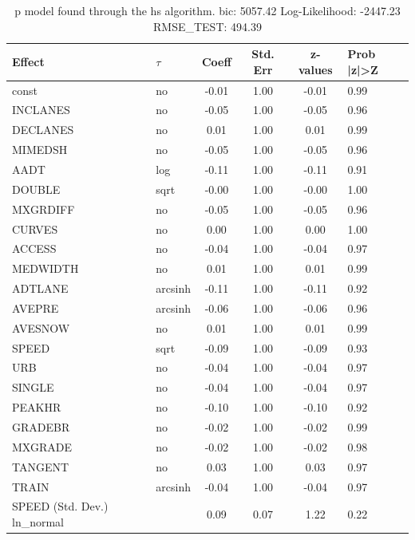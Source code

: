 \begin{table}
	\caption{p model found through the hs algorithm. bic: 5057.42 Log-Likelihood: -2447.23 RMSE_TEST: 494.39}
	\begin{center}
		\begin{tabular}{|l|l|c|c|c|l|}
			\hline
			Effect & $\tau$ & Coeff & Std. Err & z-values & Prob |z|>Z \\
			\hline
			const & no & -0.01 & 1.00 & -0.01 & 0.99 \\
			\hline
			INCLANES & no & -0.05 & 1.00 & -0.05 & 0.96 \\
			\hline
			DECLANES & no & 0.01 & 1.00 & 0.01 & 0.99 \\
			\hline
			MIMEDSH & no & -0.05 & 1.00 & -0.05 & 0.96 \\
			\hline
			AADT & log & -0.11 & 1.00 & -0.11 & 0.91 \\
			\hline
			DOUBLE & sqrt & -0.00 & 1.00 & -0.00 & 1.00 \\
			\hline
			MXGRDIFF & no & -0.05 & 1.00 & -0.05 & 0.96 \\
			\hline
			CURVES & no & 0.00 & 1.00 & 0.00 & 1.00 \\
			\hline
			ACCESS & no & -0.04 & 1.00 & -0.04 & 0.97 \\
			\hline
			MEDWIDTH & no & 0.01 & 1.00 & 0.01 & 0.99 \\
			\hline
			ADTLANE & arcsinh & -0.11 & 1.00 & -0.11 & 0.92 \\
			\hline
			AVEPRE & arcsinh & -0.06 & 1.00 & -0.06 & 0.96 \\
			\hline
			AVESNOW & no & 0.01 & 1.00 & 0.01 & 0.99 \\
			\hline
			SPEED & sqrt & -0.09 & 1.00 & -0.09 & 0.93 \\
			\hline
			URB & no & -0.04 & 1.00 & -0.04 & 0.97 \\
			\hline
			SINGLE & no & -0.04 & 1.00 & -0.04 & 0.97 \\
			\hline
			PEAKHR & no & -0.10 & 1.00 & -0.10 & 0.92 \\
			\hline
			GRADEBR & no & -0.02 & 1.00 & -0.02 & 0.99 \\
			\hline
			MXGRADE & no & -0.02 & 1.00 & -0.02 & 0.98 \\
			\hline
			TANGENT & no & 0.03 & 1.00 & 0.03 & 0.97 \\
			\hline
			TRAIN & arcsinh & -0.04 & 1.00 & -0.04 & 0.97 \\
			\hline
			SPEED (Std. Dev.) ln_normal &  & 0.09 & 0.07 & 1.22 & 0.22 \\
			\hline

\end{tabular}
\end{center}
\end{table}
